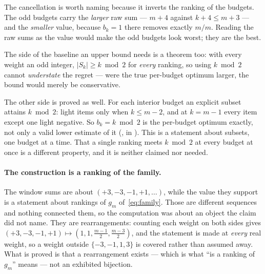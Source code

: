 The cancellation is worth naming because it inverts the ranking of the budgets. The odd
budgets carry the \emph{larger} raw sum --- $m+4$ against $k+4\le m+3$ --- and the
\emph{smaller} value, because $b_{k}=1$ there removes exactly $m/m$. Reading the raw sums as
the value would make the odd budgets look worst; they are the best.

The side of the baseline an upper bound needs is a theorem too: with every weight an odd
integer, $|S_{k}|\ge k\bmod2$ for \emph{every} ranking, so using $k\bmod2$ cannot
\emph{understate} the regret --- were the true per-budget optimum larger, the bound would
merely be conservative.

The other side is proved as well. For each interior budget an explicit subset attains
$k\bmod2$: light items only when $k\le m-2$, and at $k=m-1$ every item except one light
negative. So $b_{k}=k\bmod2$ is the per-budget optimum exactly, not only a valid lower
estimate of it (,  in
). This is a statement about subsets, one budget at a
time. That a single ranking meets $k\bmod2$ at every budget at once is a different
property, and it is neither claimed nor needed.

\paragraph{The construction is a ranking of the family.}
The window sums are about $(+3,-3,-1,+1,\dots)$, while the value they support is a statement
about rankings of $g_{m}$ of~\eqref{eq:family}. Those are different sequences and nothing
connected them, so the computation was about an object the claim did not name. They are
rearrangements: counting each weight on both sides gives
$(+3,-3,-1,+1)\mapsto(1,1,\tfrac{m-1}2,\tfrac{m-3}2)$, and the statement is made at
\emph{every} real weight, so a weight outside $\{-3,-1,1,3\}$ is covered rather than assumed
away. What is proved is that a rearrangement exists --- which is what ``is a ranking of
$g_{m}$'' means --- not an exhibited bijection.




